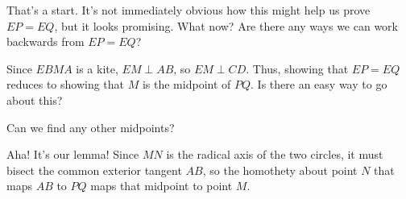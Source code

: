That's a start. It's not immediately obvious how this might help us prove $EP = EQ$, but it looks promising. What now? Are there any ways we can work backwards from $EP = EQ$?







Since $EBMA$ is a kite, $EM\perp AB$, so $EM\perp CD$. Thus, showing that $EP = EQ$ reduces to showing that $M$ is the midpoint of $PQ$. Is there an easy way to go about this?

Can we find any other midpoints?







Aha! It's our lemma! Since $MN$ is the radical axis of the two circles, it must bisect the common exterior tangent $AB$, so the homothety about point $N$ that maps $AB$ to $PQ$ maps that midpoint to point $M$.

